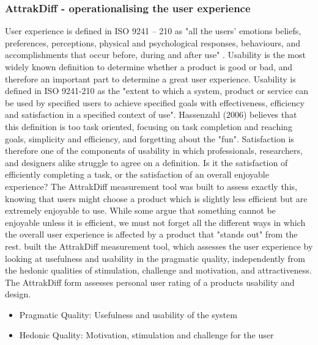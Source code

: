     \vspace{5mm} %
   
    \subsubsection{AttrakDiff - operationalising the user experience}
    
    User experience is defined in ISO 9241 – 210 as "all the users' emotions beliefs, preferences, perceptions, physical and psychological responses, behaviours, and accomplishments that occur before, during and after use" \citep{ISO9241-210}. Usability is the most widely known definition to determine whether a product is good or bad, and therefore an important part to determine a great user experience. Usability is defined in ISO 9241-210 as the "extent to which a system, product or service can be used by specified users to achieve specified goals with effectiveness, efficiency and satisfaction in a specified context of use". Hassenzahl (2006) believes that this definition is too task oriented, focusing on task completion and reaching goals, simplicity and efficiency, and forgetting about the "fun". Satisfaction is therefore one of the components of usability in which professionals, researchers, and designers alike struggle to agree on a definition. Is it the satisfaction of efficiently completing a task, or the satisfaction of an overall enjoyable experience? The AttrakDiff measurement tool was built to assess exactly this, knowing that users might choose a product which is slightly less efficient but are extremely enjoyable to use. While some argue that something cannot be enjoyable unless it is efficient, we must not forget all the different ways in which the overall user experience is affected by a product that "stands out" from the rest. \cite{Hassenzahl2000} built the AttrakDiff measurement tool, which assesses the user experience by looking at usefulness and usability in the pragmatic quality, independently from the hedonic qualities of stimulation, challenge and motivation, and attractiveness. The AttrakDiff form assesses personal user rating of a products usability and design.
    
     \begin{itemize}
        \item Pragmatic Quality: Usefulness and usability of the system
        \item Hedonic Quality: Motivation, stimulation and challenge for the user
    \end{itemize}
    
